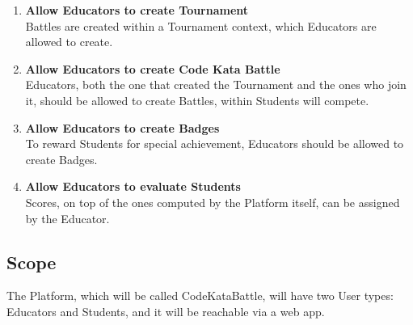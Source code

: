 \begin{enumerate}[label=\textbf{GE\arabic*:}]
    \item \textbf{Allow Educators to create Tournament}\\Battles are created within a Tournament context, which Educators are allowed to create.
    \item \textbf{Allow Educators to create Code Kata Battle}\\Educators, both the one that created the Tournament and the ones who join it, should be allowed to create Battles, within Students will compete.
    \item \textbf{Allow Educators to create Badges}\\To reward Students for special achievement, Educators should be allowed to create Badges.
    \item \textbf{Allow Educators to evaluate Students}\\Scores, on top of the ones computed by the Platform itself, can be assigned by the Educator.
\end{enumerate}

\subsection{Scope}
The Platform, which will be called CodeKataBattle, will have two User types: Educators and Students, and it will be reachable via a web app.

